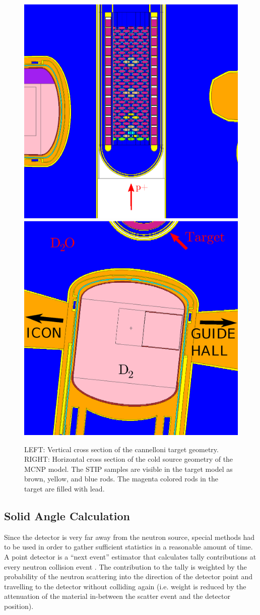 \documentclass[5p,12pt]{elsarticle}
\begin{document}
\begin{figure}[h!] 
  \centering
    \includegraphics[width=0.25\columnwidth,trim={5cm 1cm 5cm 0cm},clip]{graphics/target.eps}
    \includegraphics[width=0.63\columnwidth,trim={0cm 0cm 0cm 0cm},clip]{graphics/cs_xy.eps}
     \caption{LEFT: Vertical cross section of the cannelloni target geometry.  RIGHT:  Horizontal cross section of the cold source geometry of the MCNP model. The STIP samples are visible in the target model as brown, yellow, and blue rods.  The magenta colored rods in the target are filled with lead. \label{fig:target}}
\end{figure}

%
%
%
%
%

\subsection{Solid Angle Calculation}
\label{subsec:solidangle}

Since the detector is very far away from the neutron source, special methods had to be used in order to gather sufficient statistics in a reasonable amount of time.  A point detector is a ``next event'' estimator that calculates tally contributions at every neutron collision event \cite{mcnp5}.  The contribution to the tally is weighted by the probability of the neutron scattering into the direction of the detector point and travelling to the detector without colliding again (i.e. weight is reduced by the attenuation of the material in-between the scatter event and the detector position).  
\end{document}
